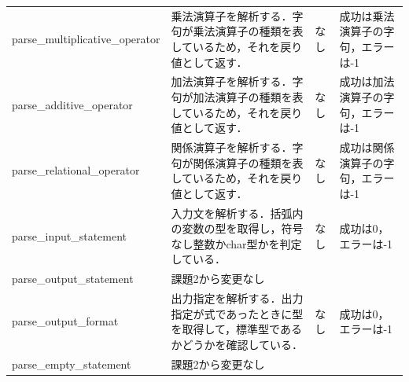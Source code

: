 \documentclass{jlreq}
\begin{document}
\begin{table}[H]
{\begin{tabular}{|l|p{15cm}|l|p{6cm}|}
      parse\_multiplicative\_operator & 乗法演算子を解析する．字句が乗法演算子の種類を表しているため，それを戻り値として返す．                                                                                                                                                                         & なし & 成功は乗法演算子の字句，エラーは-1 \\
      parse\_additive\_operator       & 加法演算子を解析する．字句が加法演算子の種類を表しているため，それを戻り値として返す．                                                                                                                                                                         & なし & 成功は加法演算子の字句，エラーは-1 \\
      parse\_relational\_operator     & 関係演算子を解析する．字句が関係演算子の種類を表しているため，それを戻り値として返す．                                                                                                                                                                         & なし & 成功は関係演算子の字句，エラーは-1 \\
      parse\_input\_statement         & 入力文を解析する．括弧内の変数の型を取得し，符号なし整数かchar型かを判定している．                                                                                                                                                                             & なし & 成功は0，エラーは-1                \\
      parse\_output\_statement        & 課題2から変更なし                                                                                                                                                                                                                                              & ~    & ~                                  \\
      parse\_output\_format           & 出力指定を解析する．出力指定が式であったときに型を取得して，標準型であるかどうかを確認している．                                                                                                                                                               & なし & 成功は0，エラーは-1                \\
      parse\_empty\_statement         & 課題2から変更なし                                                                                                                                                                                                                                              & ~    & ~                                  \\ \hline
    \end{tabular}
  }
  \label{tab:parser_func}
\end{table}
\end{document}
